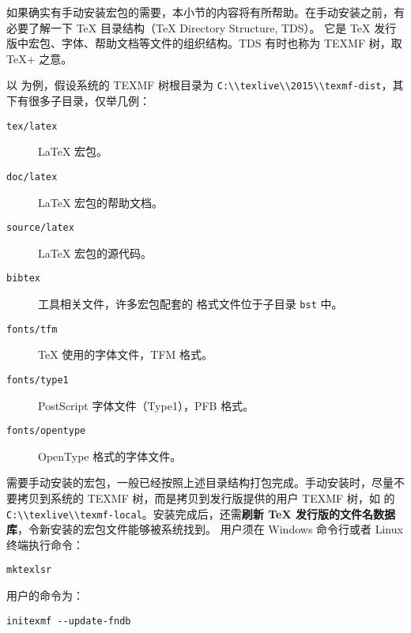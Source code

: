 如果确实有手动安装宏包的需要，本小节的内容将有所帮助。在手动安装之前，有必要了解一下 \TeX{} 目录结构（\TeX{} Directory Structure, TDS）。
它是 \TeX{} 发行版中宏包、字体、帮助文档等文件的组织结构。TDS 有时也称为 TEXMF 树，取 \TeX$+$ 之意。

以  为例，假设系统的 TEXMF 树根目录为 \nolinkurl{C:\\texlive\\2015\\texmf-dist}，其下有很多子目录，仅举几例：
\begin{description}
  \item[\texttt{tex/latex}] \LaTeX{} 宏包。
  \item[\texttt{doc/latex}] \LaTeX{} 宏包的帮助文档。
  \item[\texttt{source/latex}] \LaTeX{} 宏包的源代码。
  \item[\texttt{bibtex}]  工具相关文件，许多宏包配套的  格式文件位于子目录 \texttt{bst} 中。
  \item[\texttt{fonts/tfm}] \TeX{} 使用的字体文件，TFM 格式。
  \item[\texttt{fonts/type1}] PostScript 字体文件（Type1），PFB 格式。
  \item[\texttt{fonts/opentype}] OpenType 格式的字体文件。
\end{description}

需要手动安装的宏包，一般已经按照上述目录结构打包完成。手动安装时，尽量不要拷贝到系统的 TEXMF 树，而是拷贝到发行版提供的用户 TEXMF 树，如
 的 \nolinkurl{C:\\texlive\\texmf-local}。安装完成后，还需\textbf{刷新 \TeX{} 发行版的文件名数据库}，令新安装的宏包文件能够被系统找到。
 用户须在 Windows 命令行或者 Linux 终端执行命令：
\begin{verbatim}
mktexlsr
\end{verbatim}
 用户的命令为：
\begin{verbatim}
initexmf --update-fndb
\end{verbatim}

\endinput
